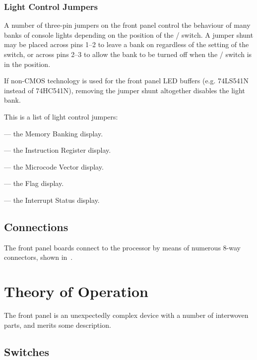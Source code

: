 \subsubsection{Light Control Jumpers}

A number of three-pin jumpers on the front panel control the behaviour
of many banks of console lights depending on the position of the
/ switch. A jumper shunt may be placed across
pins 1–2 to leave a bank on regardless of the setting of the switch,
or across pins 2–3 to allow the bank to be turned off when the
/ switch is in the  position.

If non-CMOS technology is used for the front panel LED buffers (e.g. 74LS541N
instead of 74HC541N), removing the jumper shunt altogether disables the light
bank. 

This is a list of light control jumpers:

\begin{description}
\item{} — the Memory Banking display. 
\item{} — the Instruction Register display.
\item{} — the Microcode Vector display.
\item{} — the Flag display.
\item{} — the Interrupt Status display.
\end{description}

\subsection{Connections}

The front panel boards connect to the processor by means of numerous
8-way connectors, shown in~.


\section{Theory of Operation}

The front panel is an unexpectedly complex device with a number of
interwoven parts, and merits some description.

\subsection{Switches}

